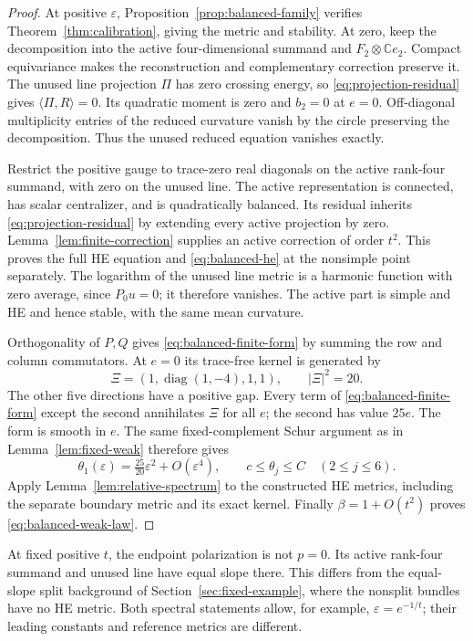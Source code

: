 \documentclass[11pt]{amsart}
\theoremstyle{definition}
\theoremstyle{remark}
\newcommand{\CC}{\mathbb C}
\newcommand{\diag}{\operatorname{diag}}
\begin{document}
\begin{proof}
At positive $\varepsilon$, Proposition~\ref{prop:balanced-family}
verifies Theorem~\ref{thm:calibration}, giving the metric and stability.
At zero, keep the decomposition into the active four-dimensional
summand and $F_2\otimes\CC e_2$. Compact equivariance makes the
reconstruction and complementary correction preserve it. The unused
line projection $\Pi$ has zero crossing energy, so
\eqref{eq:projection-residual} gives $\langle\Pi,R\rangle=0$.
Its quadratic moment is zero and $b_2=0$ at $e=0$.
Off-diagonal multiplicity entries of the reduced curvature vanish
by the circle preserving the decomposition. Thus the unused reduced
equation vanishes exactly.

Restrict the positive gauge to trace-zero real diagonals on the active
rank-four summand, with zero on the unused line. The active representation
is connected, has scalar centralizer, and is quadratically balanced.
Its residual inherits \eqref{eq:projection-residual} by extending every
active projection by zero. Lemma~\ref{lem:finite-correction} supplies
an active correction of order $t^2$. This proves the full HE equation
and \eqref{eq:balanced-he} at the nonsimple point separately.
The logarithm of the unused line metric is a harmonic function with
zero average, since $P_0u=0$; it therefore vanishes. The active part
is simple and HE and hence stable, with the same mean curvature.

Orthogonality of $P,Q$ gives \eqref{eq:balanced-finite-form} by
summing the row and column commutators. At $e=0$ its trace-free
kernel is generated by
\begin{equation}\label{eq:balanced-kernel}
 \Xi=(1,\diag(1,-4),1,1),\qquad |\Xi|^2=20.
\end{equation}
The other five directions have a positive gap. Every term of
\eqref{eq:balanced-finite-form} except the second annihilates $\Xi$
for all $e$; the second has value $25e$. The form is smooth in $e$.
The same fixed-complement Schur argument as in
Lemma~\ref{lem:fixed-weak} therefore gives
\[
 \theta_1(\varepsilon)=\tfrac{25}{20}\varepsilon^2+O(\varepsilon^4),
 \qquad c\le\theta_j\le C\quad(2\le j\le6).
\]
Apply Lemma~\ref{lem:relative-spectrum} to the constructed HE metrics,
including the separate boundary metric and its exact kernel. Finally
$\beta=1+O(t^2)$ proves \eqref{eq:balanced-weak-law}.
\end{proof}

At fixed positive $t$, the endpoint polarization is not $p=0$.
Its active rank-four summand and unused line have equal slope there.
This differs from the equal-slope split background of
Section~\ref{sec:fixed-example}, where the nonsplit bundles have
no HE metric. Both spectral statements allow, for example,
$\varepsilon=e^{-1/t}$; their leading constants and reference
metrics are different.
\end{document}

